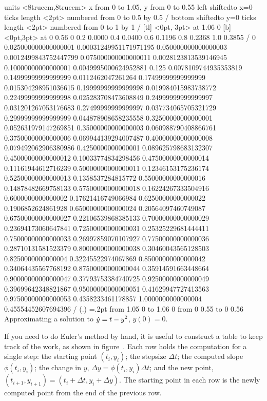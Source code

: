 \figure
\texonly
\vbox{\beginpicture
\normalgraphs
\sevenpoint
\setcoordinatesystem units <8truecm,8truecm>
\setplotarea x from 0 to 1.05, y from 0 to 0.55
\axis left shiftedto x=0 ticks length <2pt> numbered from 0 to 0.5 by 0.5 /
\axis bottom shiftedto y=0 ticks length <2pt> numbered from 0 to 1 by 1 /
 [tl] <0pt,-3pt> at 1.06 0
 [b] <0pt,3pt> at 0 0.56
\setlinear
{} 0
0.2 0.0000
0.4 0.0400
0.6 0.1196
0.8 0.2368
1.0 0.3855 /
\setquadratic
{}  0  
0.025000000000000001  0.00031249951171971195 
0.050000000000000003  0.0012499843752447799  
0.075000000000000011 0.0028123813539146945  
0.10000000000000001 0.0049995000624952881  
0.125  0.0078109744935353819 
0.14999999999999999  0.0112462047261264  
0.17499999999999999 0.015304298951036615  
0.19999999999999998  0.019984015983738772 
0.22499999999999998  0.025283708473608849  
0.24999999999999997 0.031201267053176683  
0.27499999999999997  0.037734065705321729 
0.29999999999999999  0.044878908658235558  
0.32500000000000001 0.052631979147269851  
0.35000000000000003  0.060988790408866761 
0.37500000000000006  0.069944139294007487  
0.40000000000000008 0.079492062906380986  
0.4250000000000001  0.089625798683132307 
0.45000000000000012  0.10033774834298456  
0.47500000000000014 0.11161944612716239  
0.50000000000000011  0.12346153175236174 
0.52500000000000013  0.1358537284815772  
0.55000000000000016 0.14878482669758133  
0.57500000000000018  0.16224267333504916 
0.6000000000000002  0.17621416749066984  
0.62500000000000022 0.1906852624861928  
0.65000000000000024  0.20564097460749087 
0.67500000000000027  0.22106539868385133  
0.70000000000000029 0.23694173060647841  
0.72500000000000031  0.25325229681444411 
0.75000000000000033  0.26997859070107927  
0.77500000000000036 0.28710131581523379  
0.80000000000000038  0.30460043565128503 
0.8250000000000004  0.32245522974067869  
0.85000000000000042 0.34064435567768192  
0.87500000000000044  0.35914591663448664 
0.90000000000000047  0.37793753384740725  
0.92500000000000049 0.39699642348821867  
0.95000000000000051  0.41629947727413563 
0.97500000000000053  0.4358233461178857  
1.0000000000000004 0.45554452607694396 /
\setplotsymbol ({\teeny.})
\plotsymbolspacing=.2pt
\arrow <4pt> [0.35, 1] from 1.05 0 to 1.06 0
\arrow <4pt> [0.35, 1] from 0 0.55 to 0 0.56
\endpicture}
\endtexonly
{}
\begincaption
Approximating a solution to $\displaystyle\dot y=t-y^2$, $y(0)=0$.
\endcaption
\endfigure

If you need to do Euler's method by hand, it is useful to construct a
table to keep track of the work, as shown in figure~.
Each row holds the computation for a single step: the starting point
$(t_i,y_i)$; the stepsize $\Delta t$; the computed slope
$\phi(t_i,y_i)$; the change in $y$, $\Delta y=\phi(t_i,y_i)\Delta t$;
and the new point, $(t_{i+1},y_{i+1})=(t_i+\Delta t,y_i+\Delta y)$. The starting point in
each row is the newly computed point from the end of the previous row.

